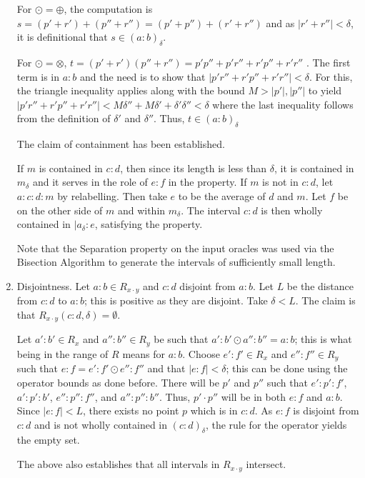 \documentclass[12pt]{article}
\begin{document}
\begin{enumerate}
    For $\odot = \oplus$, the computation is $s = (p'+r') + (p''+ r'') = (p' + p'') + (r' + r'')$ and as $|r'+r''| < \delta$, it is definitional that $s \in (a:b)_\delta$. 

    For $\odot = \otimes$, $t = (p'+r')(p''+ r'') = p'p'' + p'r'' + r' p'' + r' r''$ . The first term is in $a:b$ and the need is to show that $|p'r'' + r'p'' + r' r''|< \delta$. For this, the triangle inequality applies along with the bound $M > |p'|, |p''|$ to yield $|p'r'' + r'p'' + r' r''| < M \delta'' + M \delta' + \delta' \delta'' < \delta$ where the last inequality follows from the definition of $\delta'$ and $\delta''$.  Thus, $t \in (a:b)_\delta $

    The claim of containment has been established. 

    If $m$ is contained in $c:d$, then since its length is less than $\delta$, it is contained in $m_\delta$ and it serves in the role of $e:f$ in the property. If $m$ is not in $c:d$, let $a:c:d:m$ by relabelling. Then take $e$ to be the average of $d$ and $m$. Let $f$ be on the other side of $m$ and within $m_\delta$. The interval $c:d$ is then wholly contained in $|a_\delta:e$, satisfying the property. 

    Note that the Separation property on the input oracles was used via the Bisection Algorithm to generate the intervals of sufficiently small length. 
    
    \item Disjointness. Let $a:b \in R_{x\cdot y}$ and $c:d$ disjoint from $a:b$. Let $L$ be the distance from $c:d$ to $a:b$; this is positive as they are disjoint. Take $\delta < L$. The claim is that $R_{x \cdot y} (c:d, \delta) = \emptyset$. 
    
    Let $a':b' \in R_x$ and $a'':b'' \in R_y$ be such that $a':b' \odot a'':b'' = a:b$; this is what being in the range of $R$ means for $a:b$. Choose $e':f' \in R_x$ and $e'':f'' \in R_y$ such that $e:f = e':f' \odot e'' : f'' $ and that $|e:f| < \delta$; this can be done using the operator bounds as done before.  There will be $p'$ and $p''$ such that $e':p':f'$, $a':p':b'$, $e'':p'':f''$, and $a'':p'':b''$. Thus, $p' \cdot p''$ will be in both $e:f$ and $a:b$. Since $|e:f|< L$, there exists no point $p$ which is in $c:d$. As $e:f$ is disjoint from $c:d$ and is not wholly contained in $(c:d)_\delta$, the rule for the operator yields the empty set. 

    The above also establishes that all intervals in $R_{x \cdot y}$ intersect. 


\end{enumerate}
\end{document}
